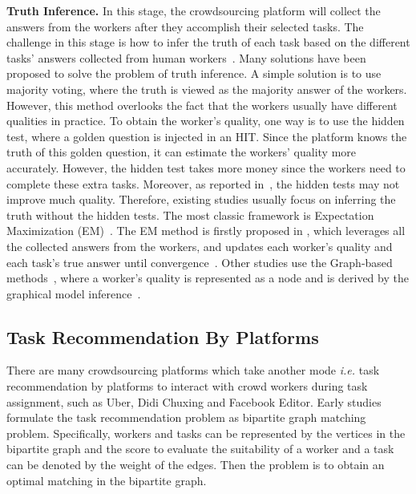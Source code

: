 \documentclass[11pt]{article}
\newcommand{\ie}{\textit{i.e.}\xspace}
\newcommand{\fakeparagraph}[1]{\vspace{1mm}\noindent\textbf{#1.}}
\begin{document}
\fakeparagraph{Truth Inference}
In this stage, the crowdsourcing platform will collect the answers from the workers after they accomplish their selected tasks.
The challenge in this stage is how to infer the truth of each task based on the different tasks' answers collected from human workers~\cite{sigmod17tutorial}. 
Many solutions have been proposed to solve the problem of truth inference.
A simple solution is to use majority voting, where the truth is viewed as the majority answer of the workers.
However, this method overlooks the fact that the workers usually have different qualities in practice.
To obtain the worker's quality, one way is to use the hidden test, where a golden question is injected in an HIT.
Since the platform knows the truth of this golden question, it can estimate the workers' quality more accurately.
However, the hidden test takes more money since the workers need to complete these extra tasks.
Moreover, as reported in~\cite{DBLP:journals/pvldb/ZhengLLSC17}, the hidden tests may not improve much quality. 
Therefore, existing studies usually focus on inferring the truth without the hidden tests.
The most classic framework is Expectation Maximization (EM)~.
The EM method is firstly proposed in \cite{dempster1977maximum},
which leverages all the collected answers from the workers,
and updates each worker's quality and each task's true answer until convergence~\cite{DBLP:journals/tkde/LiWZF16}.
Other studies use the Graph-based methods~\cite{zhao2015crowd,karger2011iterative},
where a worker's quality is represented as a node
and is derived by the graphical model inference~\cite{koller2009probabilistic}.

\subsection{Task Recommendation By Platforms}\label{sec:ta-recommend}
There are many crowdsourcing platforms which take another mode \ie task recommendation by platforms to interact with crowd workers during task assignment, such as Uber, Didi Chuxing \cite{add-Zeng1,add-Zeng2} and Facebook Editor.
Early studies formulate the task recommendation problem as bipartite graph matching problem. 
Specifically, workers and tasks can be represented by the vertices in the bipartite graph and the score to evaluate the suitability of a worker and a task can be denoted by the weight of the edges. 
Then the problem is to obtain an optimal matching in the bipartite graph.
\end{document}
